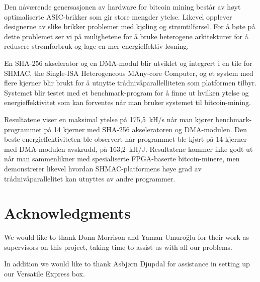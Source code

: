 Den nåværende genersasjonen av hardware for bitcoin mining består av høyt optimaliserte
ASIC-brikker som gir store mengder ytelse. Likevel opplever designerne av slike brikker
problemer med kjøling og strømtilførsel. For å bøte på dette problemet ser vi på mulighetene
for å bruke heterogene arkitekturer for å redusere strømforbruk og lage en mer energieffektiv
løsning.

En SHA-256 akselerator og en DMA-modul blir utviklet og integrert i en tile for SHMAC,
the Single-ISA Heterogeneous MAny-core Computer, og et system med flere kjerner
blir brukt for å utnytte trådnivåparallelliteten som platformen tilbyr. Systemet
blir testet med et benchmark-program for å finne ut hvilken ytelse og energieffektivitet
som kan forventes når man bruker systemet til bitcoin-mining.

Resultatene viser en maksimal ytelse på 175,5~kH/s når man kjører benchmark-programmet
på 14 kjerner med SHA-256 akseleratoren og DMA-modulen. Den beste energieffektiviteten
ble observert når programmet ble kjørt på 14 kjerner med DMA-modulen avskrudd,
på 163,2~kH/J. Resultatene kommer ikke godt ut når man sammenlikner med spesialiserte
FPGA-baserte bitcoin-minere, men demonstrerer likevel hvordan SHMAC-platformens høye
grad av trådnivåparallelitet kan utnyttes av andre programmer.

\chapter*{Acknowledgments}


We would like to thank Donn Morrison and Yaman Umuroğlu for their work as
supervisors on this project, taking time to assist us with all our problems.

In addition we would like to thank Asbjørn Djupdal for assistance in setting
up our Versatile Express box.

